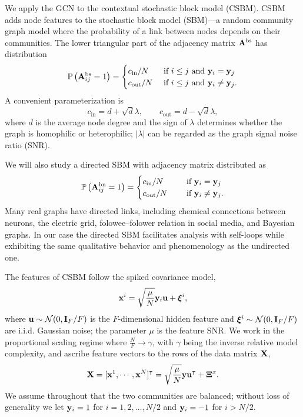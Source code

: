 \documentclass[9pt,twocolumn]{pnas-new}
\begin{document}
We apply the GCN to the contextual stochastic block model (CSBM). CSBM adds node features to the stochastic block model (SBM)---a random community graph model  \cite{deshpande2018contextual} where the probability of a link between nodes depends on their communities. The lower triangular part of the adjacency matrix $\mathbf{A}^{\text{bs}}$ has distribution
\begin{equation}\label{eqn: A bs}
    \mathbb{P}\left( \mathbf{A}_{ij}^{\text{bs}} = 1 \right)
    =
    \begin{cases}
        c_{\text{in}}/N & \text{ if } i \leq j \text{ and } \mathbf{y}_{i} = \mathbf{y}_{j} \\
        c_{\text{out}}/N & \text{ if } i \leq j \text{ and } \mathbf{y}_{i}\neq \mathbf{y}_{j}.
    \end{cases}
\end{equation}
A convenient parameterization is
\begin{equation*}
    c_{\text{in}} = d + \sqrt{d}\lambda, \quad \quad 
    c_{\text{out}} = d - \sqrt{d}\lambda,
\end{equation*}
where $d$ is the average node degree and the sign of $\lambda$ determines whether the graph is homophilic or heterophilic; $|\lambda|$ can be regarded as the graph signal noise ratio (SNR). 

We will also study a directed SBM \cite{wang1987stochastic,malliaros2013clustering} with adjacency matrix distributed as 
\begin{equation}\label{eqn: A bn}
    \mathbb{P}\left( \mathbf{A}_{ij}^{\text{bn}} = 1 \right)
    =
    \begin{cases}
        c_{\text{in}}/N &  \quad \text{ if }  \mathbf{y}_{i} = \mathbf{y}_{j} \\
        c_{\text{out}}/N & \quad \text{ if } \mathbf{y}_{i}\neq \mathbf{y}_{j}.
    \end{cases}
\end{equation}
Many real graphs have directed links, including chemical connections between neurons, the electric grid, folowee--folower relation in social media, and Bayesian graphs. In our case the directed SBM facilitates analysis with self-loops while exhibiting the same qualitative behavior and phenomenology as the undirected one.

The features of CSBM follow the spiked covariance model,
\begin{equation}\label{eqn: scm}
    \mathbf{x}^i = \sqrt{\frac{\mu}{N}}\mathbf{y}_i \mathbf{u} + \boldsymbol{\xi}^i,
\end{equation}
where $\mathbf{u} \sim \mathcal{N}(0,\mathbf{I}_F/F)$ is the $F$-dimensional hidden feature and $\boldsymbol{\xi}^i \sim \mathcal{N}(0,\mathbf{I}_F/F)$ are i.i.d. Gaussian noise; the parameter $\mu$ is the feature SNR. We work in the proportional scaling regime where $\frac{N}{F} \to \gamma$, with $\gamma$ being the inverse relative model complexity, and ascribe feature vectors to the rows of the data matrix $\mathbf{X}$,
\begin{equation}
    \mathbf{X} = [\mathbf{x}^1,\cdots,\mathbf{x}^N]^\intercal =\sqrt{\frac{\mu}{N}}\mathbf{y} \mathbf{u}^\intercal  + \boldsymbol{\Xi}^x.
\end{equation}
We assume throughout that the two communities are balanced; without loss of generality we let $\mathbf{y}_i = 1$ for $i = 1, 2, \ldots, {N}/{2}$ and $\mathbf{y}_i = -1$ for $i > {N}/{2}$.
\end{document}
